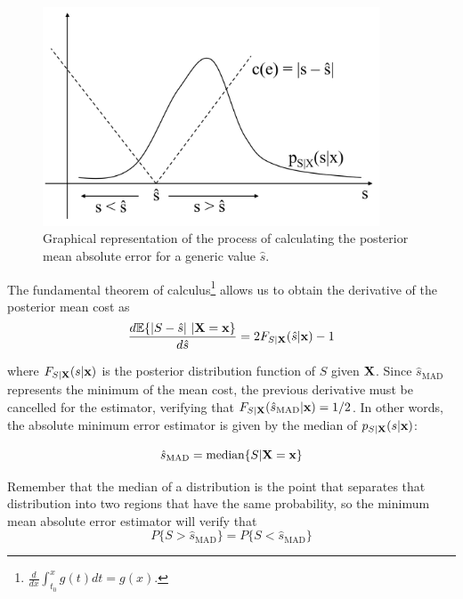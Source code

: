 \begin{figure}[t]
  \begin{center}
  \includegraphics[width=10cm]{Figures//estimador_absoluto.png}
    \caption{Graphical representation of  the process of calculating the posterior mean absolute error for a generic value $\hat s$.}
    \label{fig:estimador_absoluto}
  \end{center}
\end{figure}

The fundamental theorem of calculus\footnote{$\frac{d}{d x} \int_{t_0}^x g(t) dt = g(x)$.} allows us to obtain the derivative of the posterior mean cost as
\begin{equation}
\frac{d \mathbb{E}\{|S - \hat s|~|{\bf X} = {\bf x} \}}{d \hat s} = 2 F_{S|{\bf X}}(\hat s|{\bf x}) - 1
\end{equation}

where $F_{S|{\bf X}}(s|{\bf x})$ is the posterior distribution function of $S$ given ${\bf X}$. Since $\hat s_{\text{MAD}}$ represents the minimum of the mean cost, the previous derivative must be cancelled for the estimator, verifying that $F_{S|{\bf X}}(\hat s_{\text{MAD}}|{\bf x}) = 1/2$. In other words, the absolute minimum error estimator is given by the median of $p_{S|{\bf X}}(s|{\bf x})$:

\begin{framed}
\begin{equation}
\label{ec:estimador_MAD_final}
\hat s_{\text{MAD}} = \text{median}\{S|{\bf X} ={\bf x}\}
\end{equation}
\end{framed}

Remember that the median of a distribution is the point that separates that distribution into two regions that have the same probability, so the minimum mean absolute error estimator will verify that
{$$P\{S > \hat s_{\text{MAD}}\} = P\{S < \hat s_{\text{MAD}}\}$$}

